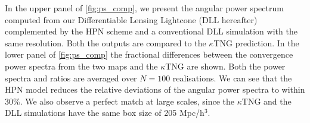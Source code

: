 \documentclass[twocolumn,twocolappendix]{aastex63}
\begin{document}
In the upper panel of \autoref{fig:ps_comp}, we present the angular power spectrum computed from our Differentiable Lensing Lightcone (DLL hereafter) complemented by the HPN scheme and a conventional DLL simulation with the same resolution. Both the outputs are compared to the $\kappa$TNG prediction. In the lower panel  of \autoref{fig:ps_comp} the fractional differences between the convergence power spectra from the two maps and the $\kappa$TNG are shown.  Both the power spectra and ratios are averaged over $N = 100$ realisations. 
We can see that the HPN  model reduces the relative deviations of the angular power spectra to within 30\%. 
We also observe a perfect match at large scales, since the $\kappa$TNG and the DLL simulations have the same box size of 205 Mpc/h$^3$.
\end{document}
